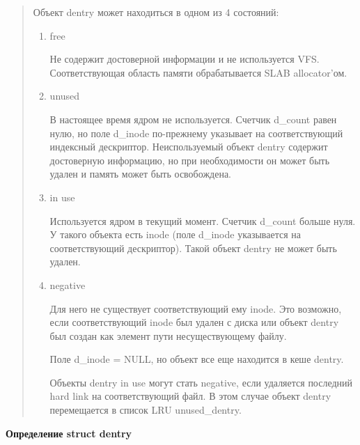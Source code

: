 \begin{quote}
Объект dentry может находиться в одном из 4 состояний:
\begin{enumerate}
\item free

Не содержит достоверной информации и не используется VFS. Соответствующая область памяти обрабатывается SLAB allocator'ом.
\item unused

В настоящее время ядром не используется. Счетчик d\_count равен нулю, но поле d\_inode по-прежнему указывает на соответствующий индексный дескриптор. Неиспользуемый объект dentry содержит достоверную информацию, но при необходимости он может быть удален и память может быть освобождена.

\item in use

Используется ядром в текущий момент. Счетчик d\_count больше нуля. У такого объекта есть inode (поле d\_inode указывается на соответствующий дескриптор). Такой объект dentry не может быть удален.

\item negative

Для него не существует соответствующий ему inode. Это возможно, если соответствующий inode был удален с диска или объект dentry был создан как элемент пути несуществующему файлу.

Поле d\_inode = NULL, но объект все еще находится в кеше dentry.

Объекты dentry in use могут стать negative, если удаляется последний hard link на соответствующий файл. В этом случае объект dentry перемещается в список LRU unused\_dentry.
\end{enumerate}
\end{quote}

\textbf{Определение struct dentry}

